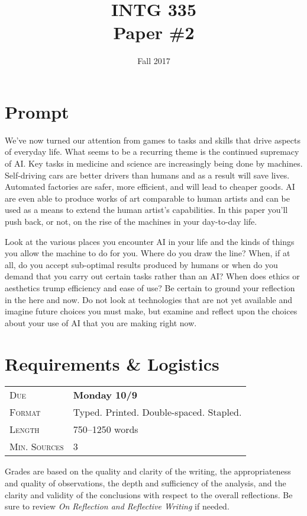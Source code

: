 \documentclass[nobib]{tufte-handout}
\title{INTG 335 \\ Paper \#2 }
\date{ Fall 2017 }
\begin{document}
\maketitle

\section{Prompt}

We've now turned our attention from games to tasks and skills that drive aspects of everyday life. What seems to be a recurring theme is the continued supremacy of AI\@. Key tasks in medicine and science are increasingly being done by machines. Self-driving cars are better drivers than humans and as a result will save lives. Automated factories are safer, more efficient, and will lead to cheaper goods. AI are even able to produce works of art comparable to human artists and can be used as a means to extend the human artist's capabilities. In this paper you'll push back, or not, on the rise of the machines in your day-to-day life.

Look at the various places you encounter AI in your life and the kinds of things you allow the machine to do for you. Where do you draw the line? When, if at all, do you accept sub-optimal results produced by humans or when do you demand that you carry out certain tasks rather than an AI\@? When does ethics or aesthetics trump efficiency and ease of use? Be certain to ground your reflection in the here and now. Do not look at technologies that are not yet available and imagine future choices you must make, but examine and reflect upon the choices about your use of AI that you are making right now.

\section{Requirements \& Logistics}

\begin{tabular}{ll}
\textsc{Due} & \textbf{Monday 10/9}  \\
\textsc{Format} & Typed. Printed. Double-spaced. Stapled. \\
\textsc{Length} & 750--1250 words \\
\textsc{Min. Sources} & 3
\end{tabular}
\vspace{.25in}

Grades are based on the quality and clarity of the writing, the appropriateness and quality of observations, the depth and sufficiency of the analysis, and the clarity and validity of the conclusions with respect to the overall reflections. Be sure to review \textit{On Reflection and Reflective Writing} if needed.
\end{document}
